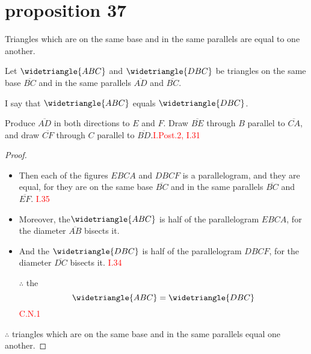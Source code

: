 
\section*{proposition 37}

\begin{thm}
Triangles which are on the same base and in the same parallels are equal to one another.
\end{thm}

Let $\widetriangle{ABC}$ and $\widetriangle{DBC}$ be triangles on the same base $\overline{BC}$ and in the same parallels $\overline{AD}$ and $\overline{BC}$.

\begin{figure}[H]
	\caption{}
\end{figure}

I say that $\widetriangle{ABC}$ equals $\widetriangle{DBC}$.

Produce $\overline{AD}$ in both directions to $E$ and $F$. Draw $\overline{BE}$ through $B$ parallel to $\overline{CA}$, and draw $\overline{CF}$ through $C$ parallel to $\overline{BD}$.\hfill\textcolor{red}{I.Post.2, I.31}

\begin{figure}[H]
	\caption{}
\end{figure}

\begin{proof}

\begin{itemize}

\item Then each of the figures $EBCA$ and $DBCF$ is a parallelogram, and they are equal, for they are on the same base $\overline{BC}$ and in the same parallels $\overline{BC}$ and $\overline{EF}$. \hfill\textcolor{red}{I.35}

\item Moreover, the$\widetriangle{ABC}$ is half of the parallelogram $EBCA$, for the diameter $\overline{AB}$ bisects it. 

\item And the $\widetriangle{DBC}$ is half of the parallelogram $DBCF$, for the diameter $\overline{DC}$ bisects it. 
\hfill\textcolor{red}{I.34}

\item[$\therefore$] the 
\[\widetriangle{ABC} = \widetriangle{DBC}\] \hfill\textcolor{red}{C.N.1}
\end{itemize}

$\therefore$ triangles which are on the same base and in the same parallels equal one another.

\end{proof}

\clearpage
